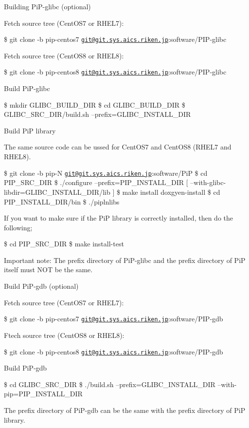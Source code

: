 \begin{DoxyEnumerate}
\item Building Pi\-P-\/glibc (optional)

Fetch source tree (Cent\-O\-S7 or R\-H\-E\-L7)\-:

\$ git clone -\/b pip-\/centos7 \href{mailto:git@git.sys.aics.riken.jp}{\tt git@git.\-sys.\-aics.\-riken.\-jp}\-:software/\-P\-I\-P-\/glibc

Fetch source tree (Cent\-O\-S8 or R\-H\-E\-L8)\-:

\$ git clone -\/b pip-\/centos8 \href{mailto:git@git.sys.aics.riken.jp}{\tt git@git.\-sys.\-aics.\-riken.\-jp}\-:software/\-P\-I\-P-\/glibc

Build Pi\-P-\/glibc

\$ mkdir G\-L\-I\-B\-C\-\_\-\-B\-U\-I\-L\-D\-\_\-\-D\-I\-R \$ cd G\-L\-I\-B\-C\-\_\-\-B\-U\-I\-L\-D\-\_\-\-D\-I\-R \$ G\-L\-I\-B\-C\-\_\-\-S\-R\-C\-\_\-\-D\-I\-R/build.\-sh --prefix=G\-L\-I\-B\-C\-\_\-\-I\-N\-S\-T\-A\-L\-L\-\_\-\-D\-I\-R
\item Build Pi\-P library

The same source code can be ussed for Cent\-O\-S7 and Cent\-O\-S8 (R\-H\-E\-L7 and R\-H\-E\-L8).

\$ git clone -\/b pip-\/\-N \href{mailto:git@git.sys.aics.riken.jp}{\tt git@git.\-sys.\-aics.\-riken.\-jp}\-:software/\-Pi\-P \$ cd P\-I\-P\-\_\-\-S\-R\-C\-\_\-\-D\-I\-R \$ ./configure --prefix=P\-I\-P\-\_\-\-I\-N\-S\-T\-A\-L\-L\-\_\-\-D\-I\-R \mbox{[} --with-\/glibc-\/libdir=G\-L\-I\-B\-C\-\_\-\-I\-N\-S\-T\-A\-L\-L\-\_\-\-D\-I\-R/lib \mbox{]} \$ make install doxgyen-\/install \$ cd P\-I\-P\-\_\-\-I\-N\-S\-T\-A\-L\-L\-\_\-\-D\-I\-R/bin \$ ./piplnlibs

If you want to make sure if the Pi\-P library is correctly installed, then do the following;

\$ cd P\-I\-P\-\_\-\-S\-R\-C\-\_\-\-D\-I\-R \$ make install-\/test

Important note\-: The prefix directory of Pi\-P-\/glibc and the prefix directory of Pi\-P itself must N\-O\-T be the same.
\item Build Pi\-P-\/gdb (optional)

Fetch source tree (Cent\-O\-S7 or R\-H\-E\-L7)\-:

\$ git clone -\/b pip-\/centos7 \href{mailto:git@git.sys.aics.riken.jp}{\tt git@git.\-sys.\-aics.\-riken.\-jp}\-:software/\-P\-I\-P-\/gdb

Ftech source tree (Cent\-O\-S8 or R\-H\-E\-L8)\-:

\$ git clone -\/b pip-\/centos8 \href{mailto:git@git.sys.aics.riken.jp}{\tt git@git.\-sys.\-aics.\-riken.\-jp}\-:software/\-P\-I\-P-\/gdb

Build Pi\-P-\/gdb

\$ cd G\-L\-I\-B\-C\-\_\-\-S\-R\-C\-\_\-\-D\-I\-R \$ ./build.sh --prefix=G\-L\-I\-B\-C\-\_\-\-I\-N\-S\-T\-A\-L\-L\-\_\-\-D\-I\-R --with-\/pip=P\-I\-P\-\_\-\-I\-N\-S\-T\-A\-L\-L\-\_\-\-D\-I\-R

The prefix directory of Pi\-P-\/gdb can be the same with the prefix directory of Pi\-P library.
\end{DoxyEnumerate}

